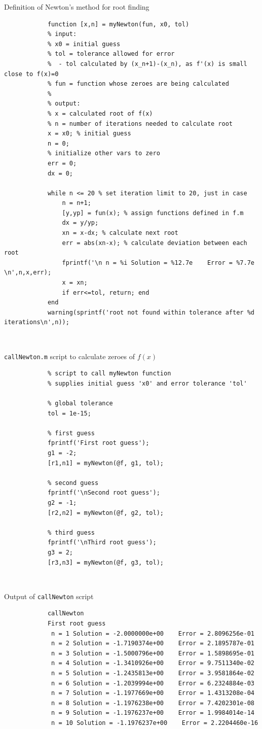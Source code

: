 \documentclass[11pt]{article}
\begin{document}
\begin{enumerate}
\begin{enumerate}[(a)]
			\begin{center}
				Definition of Newton's method for root finding
			\end{center}
			\begin{verbatim}
			function [x,n] = myNewton(fun, x0, tol)
			% input:
			% x0 = initial guess
			% tol = tolerance allowed for error
			%  - tol calculated by (x_n+1)-(x_n), as f'(x) is small close to f(x)=0
			% fun = function whose zeroes are being calculated
			%
			% output:
			% x = calculated root of f(x)
			% n = number of iterations needed to calculate root
			x = x0; % initial guess
			n = 0;
			% initialize other vars to zero
			err = 0;
			dx = 0;

			while n <= 20 % set iteration limit to 20, just in case
			    n = n+1;
			    [y,yp] = fun(x); % assign functions defined in f.m
			    dx = y/yp;
			    xn = x-dx; % calculate next root
			    err = abs(xn-x); % calculate deviation between each root
			    fprintf('\n n = %i Solution = %12.7e    Error = %7.7e \n',n,x,err);
			    x = xn;
			    if err<=tol, return; end
			end
			warning(sprintf('root not found within tolerance after %d iterations\n',n));
			\end{verbatim} \

			\begin{center}
				\texttt{callNewton.m} script to calculate zeroes of $f(x)$
			\end{center}
			\begin{verbatim}
			% script to call myNewton function
			% supplies initial guess 'x0' and error tolerance 'tol'

			% global tolerance
			tol = 1e-15;

			% first guess
			fprintf('First root guess');
			g1 = -2;
			[r1,n1] = myNewton(@f, g1, tol);

			% second guess
			fprintf('\nSecond root guess');
			g2 = -1;
			[r2,n2] = myNewton(@f, g2, tol);

			% third guess
			fprintf('\nThird root guess');
			g3 = 2;
			[r3,n3] = myNewton(@f, g3, tol);
			\end{verbatim} \

			\begin{center}
				Output of \texttt{callNewton} script
			\end{center}
			\begin{verbatim}
			callNewton
			First root guess
			 n = 1 Solution = -2.0000000e+00    Error = 2.8096256e-01
			 n = 2 Solution = -1.7190374e+00    Error = 2.1895787e-01
			 n = 3 Solution = -1.5000796e+00    Error = 1.5898695e-01
			 n = 4 Solution = -1.3410926e+00    Error = 9.7511340e-02
			 n = 5 Solution = -1.2435813e+00    Error = 3.9581864e-02
			 n = 6 Solution = -1.2039994e+00    Error = 6.2324884e-03
			 n = 7 Solution = -1.1977669e+00    Error = 1.4313208e-04
			 n = 8 Solution = -1.1976238e+00    Error = 7.4202301e-08
			 n = 9 Solution = -1.1976237e+00    Error = 1.9984014e-14
			 n = 10 Solution = -1.1976237e+00    Error = 2.2204460e-16


\end{verbatim}
\end{enumerate}
\end{enumerate}
\end{document}
